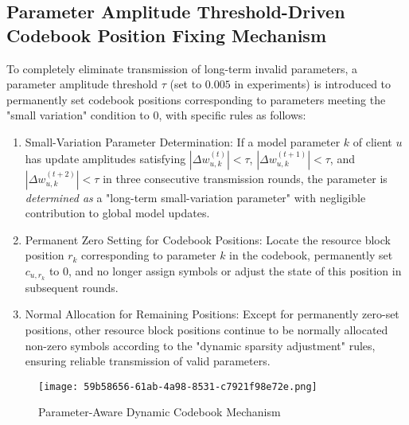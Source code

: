 \documentclass[runningheads]{llncs}
\begin{document}
\subsection{Parameter Amplitude Threshold-Driven Codebook Position Fixing Mechanism}
To completely eliminate transmission of long-term invalid parameters, a parameter amplitude threshold $\tau$ (set to $0.005$ in experiments) is introduced to permanently set codebook positions corresponding to parameters meeting the "small variation" condition to $0$, with specific rules as follows:
\begin{enumerate}
\item Small-Variation Parameter Determination: If a model parameter $k$ of client $u$ has update amplitudes satisfying $|\Delta w_{u,k}^{(t)}| < \tau$, $|\Delta w_{u,k}^{(t+1)}| < \tau$, and $|\Delta w_{u,k}^{(t+2)}| < \tau$ in three consecutive transmission rounds, the parameter is \textit{determined as} a "long-term small-variation parameter" with negligible contribution to global model updates.

\item Permanent Zero Setting for Codebook Positions: Locate the resource block position $r_k$ corresponding to parameter $k$ in the codebook, permanently set $c_{u,r_k}$ to $0$, and no longer assign symbols or adjust the state of this position in subsequent rounds.

\item Normal Allocation for Remaining Positions: Except for permanently zero-set positions, other resource block positions continue to be normally allocated non-zero symbols according to the "dynamic sparsity adjustment" rules, ensuring reliable transmission of valid parameters.
\end{enumerate}
\begin{figure}[!h]
\centering
\texttt{[image: 59b58656-61ab-4a98-8531-c7921f98e72e.png]} %
\caption{Parameter-Aware Dynamic Codebook Mechanism} 
\label{fig1}
\end{figure}
\end{document}

